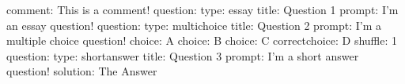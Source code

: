 comment: This is a comment!
question:
    type: essay
    title: Question 1
    prompt: I'm an essay question!
question:
    type: multichoice
    title: Question 2
    prompt: I'm a multiple choice question!
        choice: A
        choice: B
        choice: C
        correctchoice: D
        shuffle: 1
question:
    type: shortanswer
    title: Question 3
    prompt: I'm a short answer question!
        solution: The Answer

